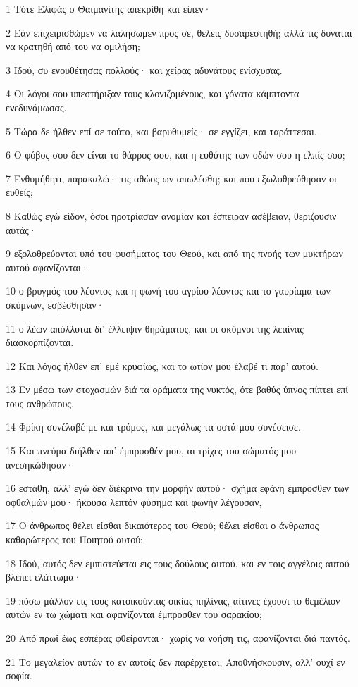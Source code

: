 \par 1 Τότε Ελιφάς ο Θαιμανίτης απεκρίθη και είπεν·
\par 2 Εάν επιχειρισθώμεν να λαλήσωμεν προς σε, θέλεις δυσαρεστηθή; αλλά τις δύναται να κρατηθή από του να ομιλήση;
\par 3 Ιδού, συ ενουθέτησας πολλούς· και χείρας αδυνάτους ενίσχυσας.
\par 4 Οι λόγοι σου υπεστήριξαν τους κλονιζομένους, και γόνατα κάμπτοντα ενεδυνάμωσας.
\par 5 Τώρα δε ήλθεν επί σε τούτο, και βαρυθυμείς· σε εγγίζει, και ταράττεσαι.
\par 6 Ο φόβος σου δεν είναι το θάρρος σου, και η ευθύτης των οδών σου η ελπίς σου;
\par 7 Ενθυμήθητι, παρακαλώ· τις αθώος ων απωλέσθη; και που εξωλοθρεύθησαν οι ευθείς;
\par 8 Καθώς εγώ είδον, όσοι ηροτρίασαν ανομίαν και έσπειραν ασέβειαν, θερίζουσιν αυτάς·
\par 9 εξολοθρεύονται υπό του φυσήματος του Θεού, και από της πνοής των μυκτήρων αυτού αφανίζονται·
\par 10 ο βρυγμός του λέοντος και η φωνή του αγρίου λέοντος και το γαυρίαμα των σκύμνων, εσβέσθησαν·
\par 11 ο λέων απόλλυται δι' έλλειψιν θηράματος, και οι σκύμνοι της λεαίνας διασκορπίζονται.
\par 12 Και λόγος ήλθεν επ' εμέ κρυφίως, και το ωτίον μου έλαβέ τι παρ' αυτού.
\par 13 Εν μέσω των στοχασμών διά τα οράματα της νυκτός, ότε βαθύς ύπνος πίπτει επί τους ανθρώπους,
\par 14 Φρίκη συνέλαβέ με και τρόμος, και μεγάλως τα οστά μου συνέσεισε.
\par 15 Και πνεύμα διήλθεν απ' έμπροσθέν μου, αι τρίχες του σώματός μου ανεσηκώθησαν·
\par 16 εστάθη, αλλ' εγώ δεν διέκρινα την μορφήν αυτού· σχήμα εφάνη έμπροσθεν των οφθαλμών μου· ήκουσα λεπτόν φύσημα και φωνήν λέγουσαν,
\par 17 Ο άνθρωπος θέλει είσθαι δικαιότερος του Θεού; θέλει είσθαι ο άνθρωπος καθαρώτερος του Ποιητού αυτού;
\par 18 Ιδού, αυτός δεν εμπιστεύεται εις τους δούλους αυτού, και εν τοις αγγέλοις αυτού βλέπει ελάττωμα·
\par 19 πόσω μάλλον εις τους κατοικούντας οικίας πηλίνας, αίτινες έχουσι το θεμέλιον αυτών εν τω χώματι και αφανίζονται έμπροσθεν του σαρακίου;
\par 20 Από πρωΐ έως εσπέρας φθείρονται· χωρίς να νοήση τις, αφανίζονται διά παντός.
\par 21 Το μεγαλείον αυτών το εν αυτοίς δεν παρέρχεται; Αποθνήσκουσιν, αλλ' ουχί εν σοφία.


